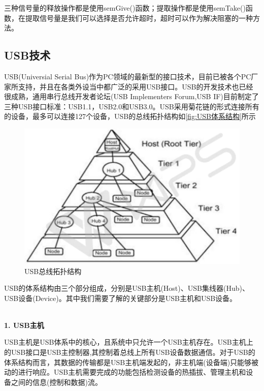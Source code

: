 三种信号量的释放操作都是使用semGive()函数；提取操作都是使用semTake()函数，在提取信号量是我们可以选择是否允许超时，超时可以作为解决阻塞的一种方法。




\subsection{USB技术}
	USB(Universial Serial Bus)作为PC领域的最新型的接口技术，目前已被各个PC厂家所支持，并且在各类外设当中都广泛的采用USB接口。USB的开发技术也已经很成熟，通用串行总线开发者论坛(USB Implementers Forum,USB IF)目前制定了三种USB接口标准：USB1.1，USB2.0和USB3.0。USB采用菊花链的形式连接所有的设备，最多可以连接127个设备，USB的总线拓扑结构如\autoref{fig:USB体系结构}所示
\begin{figure}[!h]
\centering
\includegraphics[width=1.0\textwidth]{./graphics/usb-structure.pdf}
\caption{USB总线拓扑结构}\label{fig:USB体系结构}
\end{figure}


USB的体系结构由三个部分组成，分别是USB主机(Host)、USB集线器(Hub)、USB设备(Device)。其中我们需要了解的关键部分是USB主机和USB设备。

\\
	
\noindent \textbf{1. USB主机}
	
	USB主机是USB体系中的核心，且系统中只允许一个USB主机存在。USB主机上的USB接口是USB主控制器,其控制着总线上所有USB设备数据通信。对于USB的体系结构而言，其数据的传输都是USB主机端发起的，非主机端(设备端)只能够被动的进行响应。USB主机需要完成的功能包括检测设备的热插拔、管理主机和设备之间的信息(控制和数据)流\cite{李雪红2004USB}\cite{莫宏伟2001USB}。


\\

